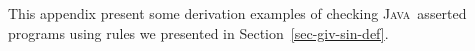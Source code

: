 \documentclass[a4paper]{llncs}
\newcommand{\java}{\textsc{Java}}
\begin{document}
This appendix present some derivation examples of checking
\java~asserted programs using rules we presented in
Section~\ref{sec-giv-sin-def}.



\end{document}
